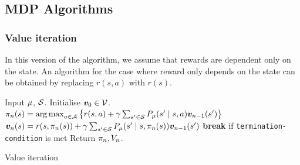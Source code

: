 \newcommand{\Claim}[2]{%
  \pgfputat{\pgfrelative{\pgfxy(0.4,-0.075)}{\pgfnodecenter{#1}}}%
  {\pgfbox[left,base]{#2}}}

\newcommand{\LClaim}[2]{%
  \pgfputat{\pgfrelative{\pgfxy(-0.4,-0.075)}{\pgfnodecenter{#1}}}%
  {\pgfbox[right,base]{#2}}}

\newcommand{\Bush}[3]{%
  \pgfnodecircle{#1}[virtual]{\pgfrelative{\pgfnodecenter{#2}}{#3}}{1pt}%
  \pgfnodeconnline{#2}{#1}}



\subsection{MDP Algorithms}
\label{sec:mdp-algorithms}
\subsubsection{Value iteration}
In this version of the algorithm, we assume that rewards are dependent only on the state. An algorithm for the case where reward only depends on the state can be obtained by replacing $r(s,a)$ with $r(s)$.
\label{sec:value-iteration}
\begin{frame}
  \begin{algorithm}[H]
    \begin{algorithmic}
      \State Input $\mu$, ${\mathcal{S}}$.
      \State Initialise $\val_0 \in \Vals$. %
      \State $\pol_n(s) = \argmax_{a \in \CA} \set{r(s, a) + \disc \sum_{s' \in \CS} P_\mdp(s' \mid s, a) \val_{n-1} (s')}$
      \State $\val_n(s) = r(s, \pol_n(s)) + \disc \sum_{s' \in \CS} P_\mdp(s' \mid s, \pol_n(s)) \val_{n-1} (s')$
      \EndFor
      \State \textbf{break} if \texttt{termination-condition} is met %
      \EndFor
      \State Return $\pi_n, V_n$.
    \end{algorithmic}
    \caption{Value iteration}
  \end{algorithm}
\end{frame}

